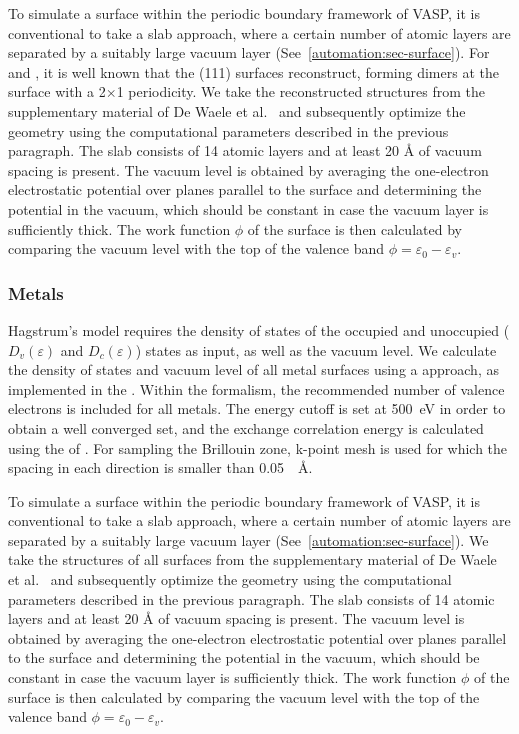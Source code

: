 \begin{refsection}
To simulate a surface within the periodic boundary framework of VASP, it is 
conventional to take a slab approach, where a certain number of atomic layers 
are separated by a suitably large vacuum layer 
(See~\ref{automation:sec-surface}). For  and , it is 
well known that the (111) surfaces reconstruct, forming dimers at the surface 
with a 2$\times$1 periodicity. We take the reconstructed structures from the 
supplementary material of De Waele et al.~\cite{DeWaele2016} and subsequently 
optimize the geometry using the computational parameters described in the 
previous paragraph. The slab consists of 14 atomic layers and at least 20 
\si{\angstrom} of vacuum spacing is present. The vacuum level is obtained by 
averaging the one-electron electrostatic potential over planes parallel to the 
surface and determining the potential in the vacuum, which should be constant 
in case the vacuum layer is sufficiently thick. The work function $\phi$ of 
the surface is then calculated by comparing the vacuum level with the top of 
the valence band $\phi = \varepsilon_0 - \varepsilon_v$.

\subsubsection{Metals}  \label{appendix:sec-metals} 

Hagstrum's model requires the density of states of the occupied and unoccupied 
($D_v(\varepsilon)$ and $D_c(\varepsilon)$) states as input, as well as 
the vacuum level. We calculate the density of states and vacuum level of 
all metal surfaces using a  approach, as implemented in the 
. Within the  formalism, the recommended number of valence 
electrons is included for all metals. The energy cutoff is set at 
500~\si{\electronvolt} in order to obtain a well converged  
set, and the exchange correlation energy is calculated using the  
of . For sampling the Brillouin zone,  k-point mesh is used 
for which the spacing in each direction is smaller than 0.05~\si{\per\angstrom}.

To simulate a surface within the periodic boundary framework of VASP, it is 
conventional to take a slab approach, where a certain number of atomic layers 
are separated by a suitably large vacuum layer (See~\ref{automation:sec-surface}).
We take the structures of all surfaces from the 
supplementary material of De Waele et al.~\cite{DeWaele2016} and subsequently 
optimize the geometry using the computational parameters described in the 
previous paragraph. The slab consists of 14 atomic layers and at least 20 
\si{\angstrom} of vacuum spacing is present. The vacuum level is obtained by 
averaging the one-electron electrostatic potential over planes parallel to the 
surface and determining the potential in the vacuum, which should be constant 
in case the vacuum layer is sufficiently thick. The work function $\phi$ of 
the surface is then calculated by comparing the vacuum level with the top of 
the valence band $\phi = \varepsilon_0 - \varepsilon_v$. 


\end{refsection}
